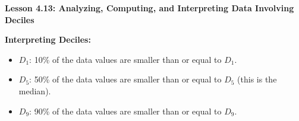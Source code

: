 \begin{center}
\textbf{Lesson 4.13: Analyzing, Computing, and Interpreting Data Involving Deciles}
\end{center}

\vspace*{-1.5ex}

\noindent\textbf{Interpreting Deciles:}  
\begin{itemize}
    \item \(D_1\): 10\% of the data values are smaller than or equal to \(D_1\).  
    \item \(D_5\): 50\% of the data values are smaller than or equal to \(D_5\) (this is the median).  
    \item \(D_9\): 90\% of the data values are smaller than or equal to \(D_9\).  
\end{itemize}
